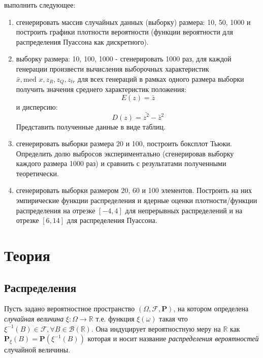 \documentclass[12pt,a4paper]{article}
\begin{document}
выполнить следующее:
\begin{enumerate}
	\item сгенерировать массив случайных данных (выборку) размера: 10, 50, 1000 и построить графики плотности вероятности (функции вероятности для распределения Пуассона как дискретного).
	
	\item выборку размера: 10, 100, 1000 - сгенерировать 1000 раз, для каждой генерации произвести вычисления выборочных характеристик $\bar x, \text{med }x, z_R, z_Q, z_{tr}$ для всех генераций в рамках одного размера выборки получить значения среднего характеристик положения:
	\begin{equation}\label{1}
		E(z) = \bar z
	\end{equation}
	и дисперсию:
	\begin{equation}\label{2}
		D(z) = \bar {z^2} - {\bar z}^2
	\end{equation}
	Представить полученные данные в виде таблиц.
	
	\item сгенерировать выборки размера 20 и 100, построить боксплот Тьюки. Определить долю выбросов экспериментально (сгенерировав выборку каждого размера 1000 раз) и сравнить с результатами полученными теоретически.
	
	\item сгенерировать выборки размером 20, 60 и 100 элементов. Построить на них эмпирические функции распределения и ядерные оценки плотности/функции распределения на отрезке $[-4, 4]$ для непрерывных распределений и на отрезке $[6,14]$ для распределения Пуассона.
\end{enumerate}

\pagebreak

\section{Теория}
\subsection{Распределения}
Пусть задано вероятностное пространство $(\Omega, \mathcal{F}, \mathbf{P})$, на котором определена \textit{случайная величина} $\xi:\Omega\to\mathbb{R}$ т.е. функция $\xi(\omega)$ такая что $\xi^{-1}(B)\in\mathcal{F},\forall{B\in\mathcal{B}(\mathbb{R})}$. Она индуцирует вероятностную меру на $\mathbb{R}$ как $\mathbf{P}_\xi(B)=\mathbf{P}(\xi^{-1}(B))$ которая и носит название \textit{распределения вероятностей} случайной величины\cite{shiryaev}.
\end{document}
